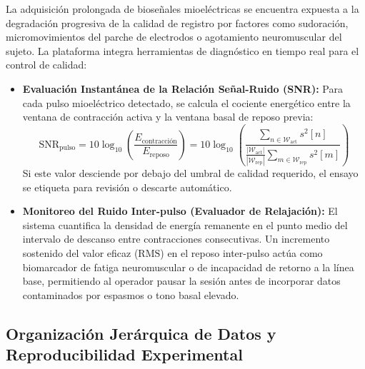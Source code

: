 La adquisición prolongada de bioseñales mioeléctricas se encuentra expuesta a la degradación progresiva de la calidad de registro por factores como sudoración, micromovimientos del parche de electrodos o agotamiento neuromuscular del sujeto. La plataforma integra herramientas de diagnóstico en tiempo real para el control de calidad:
\begin{itemize}
    \item \textbf{Evaluación Instantánea de la Relación Señal-Ruido (SNR):} Para cada pulso mioeléctrico detectado, se calcula el cociente energético entre la ventana de contracción activa y la ventana basal de reposo previa:
    \begin{equation}
        \text{SNR}_{\text{pulso}} = 10 \log_{10} \left( \frac{E_{\text{contracción}}}{E_{\text{reposo}}} \right) = 10 \log_{10} \left( \frac{\sum_{n \in \mathcal{W}_{\text{act}}} s^2[n]}{\frac{|\mathcal{W}_{\text{act}}|}{|\mathcal{W}_{\text{rep}}|} \sum_{m \in \mathcal{W}_{\text{rep}}} s^2[m]} \right)
        \label{eq:snr_pulso}
    \end{equation}
    Si este valor desciende por debajo del umbral de calidad requerido, el ensayo se etiqueta para revisión o descarte automático.
    \item \textbf{Monitoreo del Ruido Inter-pulso (Evaluador de Relajación):} El sistema cuantifica la densidad de energía remanente en el punto medio del intervalo de descanso entre contracciones consecutivas. Un incremento sostenido del valor eficaz ($\text{RMS}$) en el reposo inter-pulso actúa como biomarcador de fatiga neuromuscular o de incapacidad de retorno a la línea base, permitiendo al operador pausar la sesión antes de incorporar datos contaminados por espasmos o tono basal elevado.
\end{itemize}

\subsection{Organización Jerárquica de Datos y Reproducibilidad Experimental}
\label{subsec:organizacion_datos}


